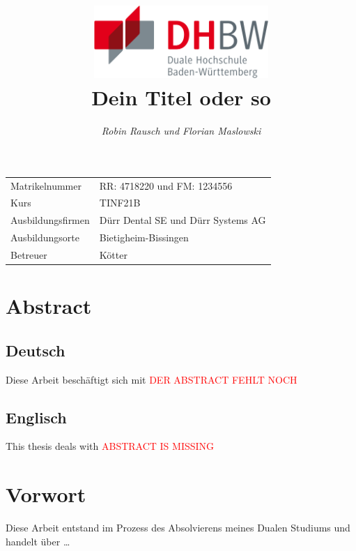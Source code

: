 \documentclass[12pt,a4paper]{article}
\author{\slshape Robin Rausch und Florian Maslowski}
\title{\includegraphics[height=2.75cm]{Bilder/dhbw_logo.png}\vspace{2cm}\\\textbf{Dein Titel oder so}}
\begin{document}
\pagestyle{titlepage}
\clearpage\maketitle
\thispagestyle{empty}
\vspace*{\fill}
\begin{center}
	\begin{tabularx}{\textwidth}{X X}
		Matrikelnummer & RR: 4718220 und FM: 1234556 \\
		Kurs & TINF21B \\
		Ausbildungsfirmen & Dürr Dental SE und Dürr Systems AG \\
		Ausbildungsorte & Bietigheim-Bissingen \\
		Betreuer & Kötter \\
	\end{tabularx}
\end{center}

\newpage
\pagestyle{fancy_transition}
\section*{Abstract}
\subsection*{Deutsch}
Diese Arbeit beschäftigt sich mit \textcolor{red}{DER ABSTRACT FEHLT NOCH}

\subsection*{Englisch}
This thesis deals with \textcolor{red}{ABSTRACT IS MISSING}

\newpage
\section*{Vorwort}
Diese Arbeit entstand im Prozess des Absolvierens meines Dualen Studiums und handelt über \dots

\newpage
\end{document}
